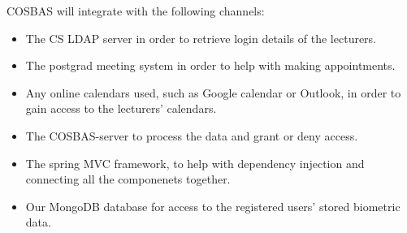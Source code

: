 COSBAS will integrate with the following channels:

\begin{itemize}
	\item The CS LDAP server in order to retrieve login details of the lecturers.
	\item The postgrad meeting system in order to help with making appointments.
	\item Any online calendars used, such as Google calendar or Outlook, in order to gain access to the lecturers' calendars.
	\item The COSBAS-server to process the data and grant or deny access.
	\item The spring MVC framework, to help with dependency injection and connecting all the componenets together.
	\item Our MongoDB database for access to the registered users'  stored biometric data. 
\end{itemize}